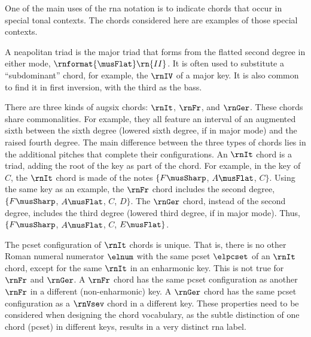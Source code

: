 
One of the main uses of the \gls{rna} notation is to
indicate chords that occur in special tonal contexts. The
chords considered here are examples of those special
contexts.


A \gls{neapolitan} triad is the major triad that forms from
the flatted second degree in either mode,
$\rnformat{\musFlat}\rn{II}$. It is often used to substitute
a ``subdominant'' chord, for example, the $\rnIV$ of a major
key. It is also common to find it in first inversion, with
the third as the bass.


There are three kinds of \gls{augsix} chords: $\rnIt$,
$\rnFr$, and $\rnGer$. These chords share commonalities. For
example, they all feature an interval of an augmented sixth
between the sixth degree (lowered sixth degree, if in major
mode) and the raised fourth degree. The main difference
between the three types of chords lies in the additional
pitches that complete their configurations. An $\rnIt$ chord
is a triad, adding the root of the key as part of the chord.
For example, in the key of $C$, the $\rnIt$ chord is made of
the notes $\{F\musSharp$, $A\musFlat$, $C\}$. Using the same
key as an example, the $\rnFr$ chord includes the second
degree, $\{F\musSharp$, $A\musFlat$, $C$, $D\}$. The
$\rnGer$ chord, instead of the second degree, includes the
third degree (lowered third degree, if in major mode). Thus,
$\{F\musSharp$, $A\musFlat$, $C$, $E\musFlat\}$.

The \gls{pcset} configuration of $\rnIt$ chords is unique.
That is, there is no other Roman numeral numerator $\elnum$
with the same \gls{pcset} $\elpcset$ of an $\rnIt$ chord,
except for the same $\rnIt$ in an enharmonic key. This is
not true for $\rnFr$ and $\rnGer$. A $\rnFr$ chord has the
same \gls{pcset} configuration as another $\rnFr$ in a
different (non-enharmonic) key. A $\rnGer$ chord has the
same \gls{pcset} configuration as a $\rnVsev$ chord in a
different key. These properties need to be considered when
designing the chord vocabulary, as the subtle distinction of
one chord (\gls{pcset}) in different keys, results in a very
distinct \gls{rna} label.
